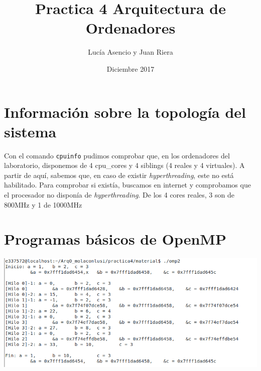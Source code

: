 \documentclass{report}
\title{Practica 4 Arquitectura de Ordenadores}
\author{Lucía Asencio y Juan Riera}
\date{Diciembre 2017}
\newcommand\tab[1][0.6cm]{\hspace*{#1}}
\newcommand\nl{\newline\tab}
\begin{document}
	\maketitle
	
	\section{Información sobre la topología del sistema}
	
	\tab Con el comando \texttt{cpuinfo} pudimos comprobar que, en los ordenadores del laboratorio, disponemos de 4 cpu\_cores y 4 siblings (4 reales y 4 virtuales). A partir de aquí, sabemos que, en caso de existir \textit{hyperthreading}, este no está habilitado. 
	\nl Para comprobar si existía, buscamos en internet y comprobamos que el procesador no disponía de \textit{hyperthreading}.
	\nl  De los 4 cores reales, 3 son de 800MHz y 1 de 1000MHz
	
	\newpage
	\section{Programas básicos de OpenMP}
	
	\begin{center}
		\includegraphics[width=6in]{imagenes_memoria/ej2.png}
	\end{center}
	
\end{document}
